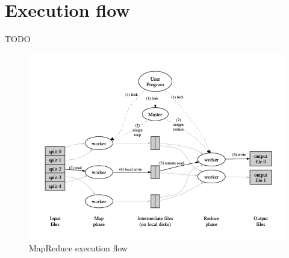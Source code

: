 \section{Execution flow}
TODO

\begin{figure}[H]
    \centering
    \includegraphics[width=\linewidth]{document/chapters/chapter_4/images/mapreduce_execution_flow.png}
    \caption{MapReduce execution flow \cite{google_mapreduce}}
    \label{fig:mapreduce_execution_flow}
\end{figure}